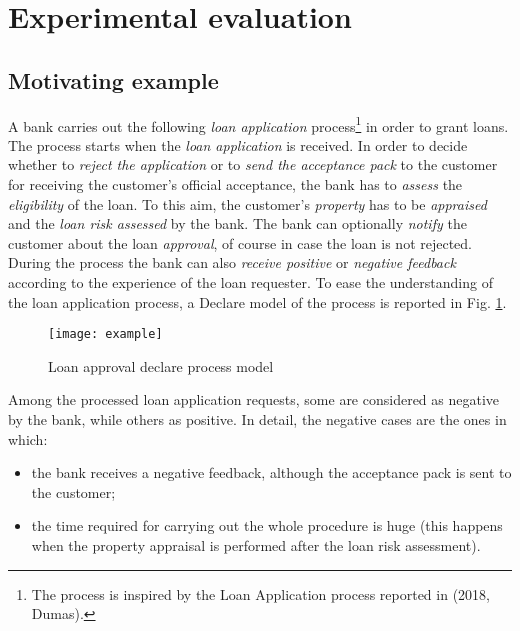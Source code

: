 
\section{Experimental evaluation}
\label{sec:eval}


\subsection{Motivating example}
A bank carries out the following \emph{loan application} process\footnote{The process is inspired by the Loan Application process reported in (2018, Dumas).} in order to grant loans. The process starts when the \emph{loan application} is received. In order to decide whether to \emph{reject the application} or to \emph{send the acceptance pack} to the customer for receiving the customer's official acceptance, the bank has to \emph{assess} the \emph{eligibility} of the loan. To this aim, the customer's \emph{property} has to be \emph{appraised} and the \emph{loan risk assessed} by the bank. The bank can optionally \emph{notify} the customer about the loan \emph{approval}, of course in case the loan is not rejected. During the process the bank can also \emph{receive positive} or \emph{negative feedback} according to the experience of the loan requester. To ease the understanding of the loan application process, a Declare model of the process is reported in Fig. \ref{fig:ex}.

\begin{figure}[t]
\centering
\texttt{[image: example]}
\caption{Loan approval declare process model }
\label{fig:ex}
\end{figure}

Among the processed loan application requests, some are considered as negative by the bank, while others as positive. In detail, the negative cases are the ones in which:
\begin{itemize}
\item the bank receives a negative feedback, although the acceptance pack is sent to the customer;
\item the time required for carrying out the whole procedure is huge (this happens when the property appraisal is performed after the loan risk assessment).
\end{itemize}

